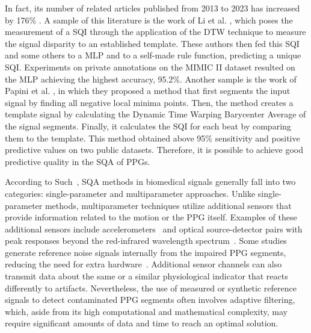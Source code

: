  In fact, its number of related articles published from 2013 to 2023 has increased by 176\% \cite{ppg-1}.  A sample of this literature is the work of Li et al. \cite{ppg-2}, which poses the measurement of a \gls{SQI} through the application of the \gls{DTW} technique to measure the signal disparity to an established template. These authors then fed this \gls{SQI} and some others to a \gls{MLP} and to a self-made rule function, predicting a unique \gls{SQI}. Experiments on private annotations on the MIMIC II dataset resulted on the \gls{MLP} achieving the highest accuracy, 95.2\%. Another sample is the work of Papini et al. \cite{ppg-3}, in which they proposed a method that first segments the input signal by finding all negative local minima points. Then, the method creates a template signal by calculating the Dynamic Time Warping Barycenter Average of the signal segments. Finally, it calculates the \gls{SQI} for each beat by comparing them to the template. This method obtained above 95\% sensitivity and positive predictive values on two public datasets. Therefore, it is possible to achieve good predictive quality in the \gls{SQA} of \glspl{PPG}.


According to Such~\cite{such2007motion}, \gls{SQA} methods in biomedical signals generally fall into two categories: single-parameter and multiparameter approaches. Unlike single-parameter methods, multiparameter techniques utilize additional sensors that provide information related to the motion or the \gls{PPG} itself. Examples of these additional sensors include accelerometers~\cite{nabavi2020robust, tuauctan2015characterization} and optical source-detector pairs with peak responses beyond the red-infrared wavelength spectrum~\cite{zhang2019motion}. Some studies generate reference noise signals internally from the impaired \gls{PPG} segments, reducing the need for extra hardware~\cite{ram2011novel, raghuram2016use}. Additional sensor channels can also transmit data about the same or a similar physiological indicator that reacts differently to artifacts. Nevertheless, the use of measured or synthetic reference signals to detect contaminated \gls{PPG} segments often involves adaptive filtering, which, aside from its high computational and mathematical complexity, may require significant amounts of data and time to reach an optimal solution.



